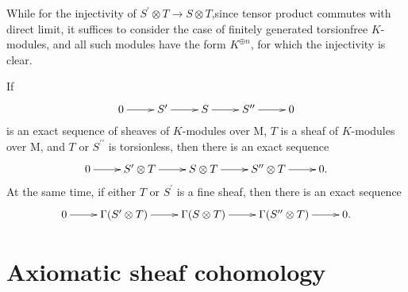 \documentclass[twoside]{article}
\begin{document}
   While for the injectivity of $S^\prime\otimes T\to S\otimes T$,since tensor product commutes with  direct limit, it suffices  to consider the case of finitely generated torsionfree $K$-modules, and all such modules have the form $K^{\oplus n}$, for which the injectivity is clear.



\begin{theorem}
     If \begin{equation*}
  \xymatrix{
  0\ar[r]&S^\prime\ar[r]&S\ar[r]&S^{\prime\prime}\ar[r]&0\\
  }
\end{equation*}
 is an exact  sequence of sheaves of $K$-modules over M,  $T$ is a sheaf of $K$-modules over M, and $T$ or $S^{\prime\prime}$ is torsionless, then there is  an exact sequence
 \begin{equation*}
  \xymatrix{
  0\ar[r]&S^\prime\otimes T\ar[r]&S\otimes T\ar[r]&S^{\prime\prime}\otimes T\ar[r]&0.\\
  }
\end{equation*}
     At the same time, if either $T$ or $S^{\prime}$ is a fine sheaf, then there is  an exact sequence
     \begin{equation*}
  \xymatrix{
  0\ar[r]&\Gamma(S^\prime\otimes T)\ar[r]&\Gamma(S\otimes T)\ar[r]&\Gamma(S^{\prime\prime}\otimes T)\ar[r]&0.\\
  }
\end{equation*}
\end{theorem}



\section{Axiomatic sheaf cohomology}
\end{document}
